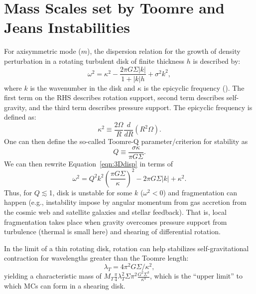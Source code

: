 \documentclass[apj]{emulateapj} %
\begin{document}
\section{Mass Scales set by Toomre and Jeans Instabilities}   \label{sec:Q}
For axisymmetric mode ($m$), the dispersion relation for the growth of density perturbation in a rotating turbulent disk 
of finite thickness $h$ 
is described by:
\begin{equation}
\omega^2 = \kappa^2 - \frac{2\pi G \Sigma |k|}{1 + |k| h} + \sigma^2 k^2,
\label{eqn:3Ddisp}
\end{equation}
where $k$ is the wavenumber in the disk and $\kappa$ is the epicyclic frequency (\citealt{Toomre64a}).
The first term on the RHS describes rotation support, second term describes self-gravity, and 
the third term describes pressure support.
The epicyclic frequency is defined as:
\begin{equation}
\kappa^2\equiv\frac{2\Omega}{R}\frac{d}{dR}\left(R^2\Omega\right).
\label{eqn:kappa}
\end{equation}
One can then define the so-called Toomre-Q parameter/criterion for stability as
\begin{equation}
Q\equiv\frac{\sigma\kappa}{\pi G \Sigma}.
\label{eqn:Q}
\end{equation}
We can then rewrite Equation~\ref{eqn:3Ddisp} in terms of 
\begin{equation}
\omega^2 = Q^2 k^2 \left(\frac{\pi G \Sigma}{\kappa}\right)^2 - 2\pi G \Sigma |k| + \kappa^2.
\end{equation}
Thus, for $Q\lesssim$1, disk is unstable for some $k$ ($\omega^2 < 0$)
and fragmentation can happen 
(e.g., instability impose by angular momentum from gas accretion from the cosmic web and 
satellite galaxies and stellar feedback).
That is, local fragmentation takes place when gravity overcomes pressure support
from turbulence (thermal is small here) and shearing of differential rotation.

In the limit of a thin rotating disk, rotation can help stabilizes 
self-gravitational contraction for wavelengths greater than the Toomre length:
\begin{equation}
\lambda_T = 4\pi^2 G\Sigma/\kappa^2,
\end{equation} 
yielding a characteristic mass of $M_T$\eq$\frac{\pi}{4}{\lambda_T^2}{\Sigma}$$\pi^2\frac{G^2\Sigma^3}{\kappa^4}$,
which is the ``upper limit'' to which MCs can form in a shearing disk.
\end{document}
